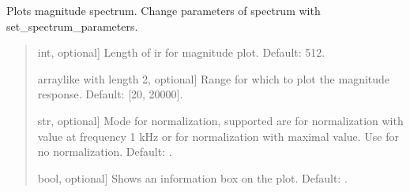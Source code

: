 \documentclass[letterpaper,10pt,english]{sphinxmanual}
\begin{document}
\begin{fulllineitems}
\begin{fulllineitems}
\label{\detokenize{classes:dsptools.classes.filter_class.Filter.plot_magnitude}}
\pysigstartsignatures
{}
\pysigstopsignatures
\sphinxAtStartPar
Plots magnitude spectrum.
Change parameters of spectrum with set\_spectrum\_parameters.
\begin{quote}\begin{description}
\begin{description}
\sphinxlineitem{\sphinxstylestrong{length\_samples}}{[}int, optional{]}
\sphinxAtStartPar
Length of ir for magnitude plot. Default: 512.

\sphinxlineitem{\sphinxstylestrong{range\_hz}}{[}array\sphinxhyphen{}like with length 2, optional{]}
\sphinxAtStartPar
Range for which to plot the magnitude response.
Default: {[}20, 20000{]}.

\sphinxlineitem{\sphinxstylestrong{normalize}}{[}str, optional{]}
\sphinxAtStartPar
Mode for normalization, supported are  for normalization
with value at frequency 1 kHz or  for normalization with
maximal value. Use  for no normalization. Default: .

\sphinxlineitem{\sphinxstylestrong{show\_info\_box}}{[}bool, optional{]}
\sphinxAtStartPar
Shows an information box on the plot. Default: .


\end{description}
\end{description}
\end{quote}
\end{fulllineitems}
\end{fulllineitems}
\end{document}

